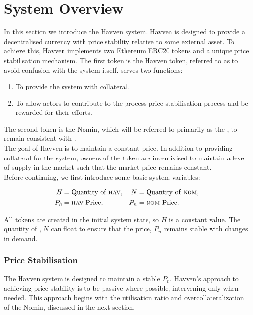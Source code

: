 \section{System Overview} In this section we introduce the Havven system. Havven is designed to provide a decentralised currency with price stability relative to some external asset. To achieve this, Havven implements two Ethereum ERC20 tokens and a unique price stabilisation mechanism. The first token is the Havven token, referred to as \HAV{} to avoid confusion with the system itself. \HAV{} serves two functions:

\begin{enumerate}
\item{To provide the system with collateral.}
\item{To allow actors to contribute to the process price stabilisation process and be rewarded for their efforts.}
\end{enumerate}

\noindent The second token is the Nomin, which will be referred to primarily as the \NOM{}, to remain consistent with \HAV{}. \\

\noindent The goal of Havven is to maintain a constant \NOM{} price. In addition to providing collateral for the system, owners of the \HAV{} token are incentivised to maintain a level of supply in the \NOM{} market such that the market price remains constant. \\

\noindent Before continuing, we first introduce some basic system variables:

\begin{align*}
H &= \text{Quantity of \textsc{hav}{},} & N &= \text{Quantity of \textsc{nom}{},} \\
P_h &= \text{\textsc{hav}{} Price,}  & P_n &= \text{\textsc{nom}{} Price.}
\end{align*}

\noindent All \HAV{} tokens are created in the initial system state, so $H$ is a constant value. The quantity of \NOM{}, $N$ can float to ensure that the \NOM{} price, $P_n$ remains stable with changes in demand.

\subsubsection*{Price Stabilisation} The Havven system is designed to maintain a stable $P_n$. Havven's approach to achieving price stability is to be passive where possible, intervening only when needed. This approach begins with the utilisation ratio and overcollateralization of the Nomin, discussed in the next section. \\

